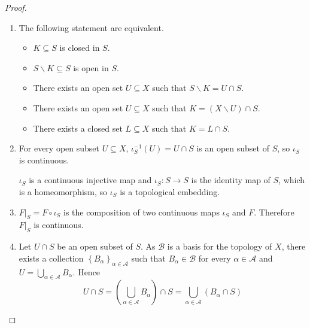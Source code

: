 \begin{proof}
\begin{enumerate}[itemsep=0pt,label={(\alph*)}]
              Hence \( f \) is a homeomorphism, which means \( S \) and \( S_{\tau} \) have the same topology.
        \item The following statement are equivalent.
              \begin{itemize}
                  \item \( K \subseteq S \) is closed in \( S \).
                  \item \( S \smallsetminus K \subseteq S \) is open in \( S \).
                  \item There exists an open set \( U \subseteq X \) such that \( S \smallsetminus K = U \cap S \).
                  \item There exists an open set \( U \subseteq X \) such that \( K = (X \smallsetminus U) \cap S \).
                  \item There exists a closed set \( L \subseteq X \) such that \( K = L \cap S \).
              \end{itemize}
        \item For every open subset \( U \subseteq X \), \( \iota_{S}^{-1}(U) = U \cap S \) is an open subset of \( S \), so \( \iota_{S} \) is continuous.

              \( \iota_{S} \) is a continuous injective map and \( \iota_{S}: S \to S \) is the identity map of \( S \), which is a homeomorphism, so \( \iota_{S} \) is a topological embedding.
        \item \( F\vert_{S} = F \circ \iota_{S} \) is the composition of two continuous maps \( \iota_{S} \) and \( F \). Therefore \( F\vert_{S} \) is continuous.
        \item Let \( U \cap S \) be an open subset of \( S \). As \( \mathcal{B} \) is a basis for the topology of \( X \), there exists a collection \( {\left\{B_{\alpha}\right\}}_{\alpha\in\mathscr{A}} \) such that \( B_{\alpha} \in \mathcal{B} \) for every \( \alpha\in\mathscr{A} \) and \( U = \bigcup_{\alpha\in\mathscr{A}} B_{\alpha} \). Hence
              \[
                  U \cap S = \left(\bigcup_{\alpha\in\mathscr{A}} B_{\alpha}\right) \cap S = \bigcup_{\alpha\in\mathscr{A}} (B_{\alpha} \cap S)
              \]


\end{enumerate}
\end{proof}
